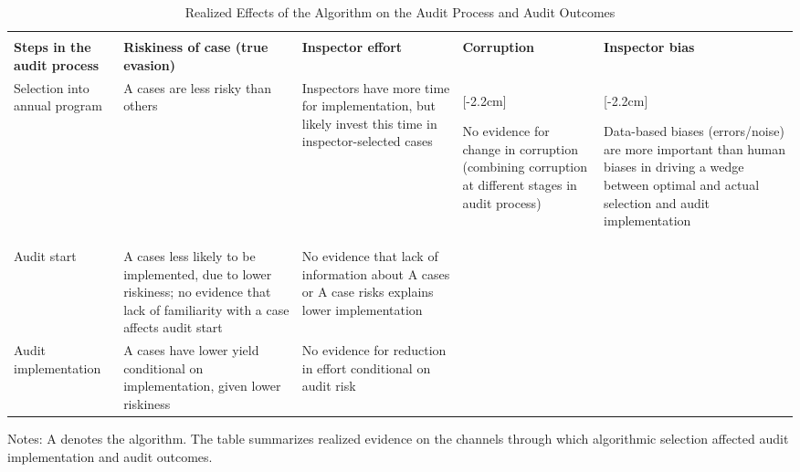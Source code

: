 \begin{table}[H]
\centering
\begin{adjustbox}{max width=\textwidth}
\begin{threeparttable}
\caption{Realized Effects of the Algorithm on the Audit Process and Audit Outcomes}
\label{tab:senegal_realized_effects}
\footnotesize
\renewcommand{\arraystretch}{2.35}
\begin{tabular}{
    >{\raggedright\arraybackslash}p{2.4cm}
    >{\raggedright\arraybackslash}p{3.2cm}
    >{\raggedright\arraybackslash}p{3.2cm}
    >{\raggedright\arraybackslash}p{2.8cm}
    >{\raggedright\arraybackslash}p{3.4cm}
}
\toprule
& \multicolumn{4}{c}{\textbf{Determinants of audit outcome / success / yield}} \\
\cmidrule(lr){2-5}
\textbf{Steps in the audit process} &
\textbf{Riskiness of case (true evasion)} &
\textbf{Inspector effort} &
\textbf{Corruption} &
\textbf{Inspector bias} \\
\midrule
Selection into annual program &
A cases are less risky than others &
Inspectors have more time for implementation, but likely invest this time in inspector-selected cases &
\multirow[c]{3}{2.8cm}[-2.2cm]{\raggedright No evidence for change in corruption (combining corruption at different stages in audit process)} &
\multirow[c]{3}{3.4cm}[-2.2cm]{\raggedright Data-based biases (errors/noise) are more important than human biases in driving a wedge between optimal and actual selection and audit implementation} \\
\addlinespace
Audit start &
A cases less likely to be implemented, due to lower riskiness; no evidence that lack of familiarity with a case affects audit start &
No evidence that lack of information about A cases or A case risks explains lower implementation &
&
\\
\addlinespace
Audit implementation &
A cases have lower yield conditional on implementation, given lower riskiness &
No evidence for reduction in effort conditional on audit risk &
&
\\
\bottomrule
\end{tabular}
\begin{tablenotes}[flushleft]
\footnotesize
\item Notes: A denotes the algorithm. The table summarizes realized evidence on the channels through which algorithmic selection affected audit implementation and audit outcomes.
\end{tablenotes}
\end{threeparttable}
\end{adjustbox}
\end{table}





